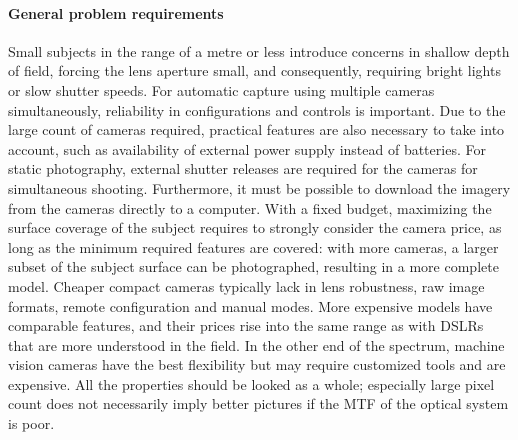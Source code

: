 \paragraph{General problem requirements}
Small subjects in the range of a metre or less introduce concerns in shallow depth of field, forcing the lens aperture small, and consequently, requiring bright lights or slow shutter speeds.
For automatic capture using multiple cameras simultaneously, reliability in configurations and controls is important.
Due to the large count of cameras required, practical features are also necessary to take into account, such as availability of external power supply instead of batteries.
For static photography, external shutter releases are required for the cameras for simultaneous shooting.
Furthermore, it must be possible to download the imagery from the cameras directly to a computer.
With a fixed budget, maximizing the surface coverage of the subject requires to strongly consider the camera price, as long as the minimum required features are covered: with more cameras, a larger subset of the subject surface can be photographed, resulting in a more complete model.
Cheaper compact cameras typically lack in lens robustness, raw image formats, remote configuration and manual modes.
More expensive models have comparable features, and their prices rise into the same range as with DSLRs that are more understood in the field.
In the other end of the spectrum, machine vision cameras have the best flexibility but may require customized tools and are expensive.
All the properties should be looked as a whole; especially large pixel count does not necessarily imply better pictures if the MTF of the optical system is poor.

